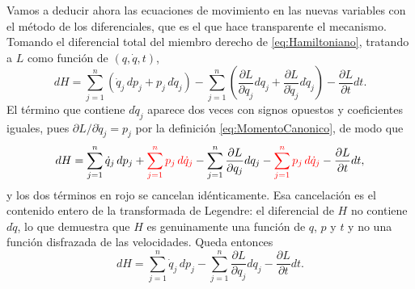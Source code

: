         Vamos a deducir ahora las ecuaciones de movimiento en las nuevas variables con el método de los diferenciales, que es el que hace transparente el mecanismo. Tomando el diferencial total del miembro derecho de \eqref{eq:Hamiltoniano}, tratando a $L$ como función de $(q,\dot{q},t)$,
        \begin{equation}\label{eq:DiferencialH1}
            dH = \sum_{j=1}^{n}\left(\dot{q}_{j}\,dp_{j} + p_{j}\,d\dot{q}_{j}\right)
            - \sum_{j=1}^{n}\left(\frac{\partial L}{\partial q_{j}}dq_{j} + \frac{\partial L}{\partial\dot{q}_{j}}d\dot{q}_{j}\right) - \frac{\partial L}{\partial t}dt .
        \end{equation}
        El término que contiene $d\dot{q}_{j}$ aparece dos veces con signos opuestos y coeficientes iguales, pues $\partial L/\partial\dot{q}_{j} = p_{j}$ por la definición \eqref{eq:MomentoCanonico}, de modo que
        \begin{equation}\label{eq:DiferencialH2}
            dH = \sum_{j=1}^{n}\dot{q}_{j}\,dp_{j} + \textcolor{red}{\sum_{j=1}^{n}p_{j}\,d\dot{q}_{j}} - \sum_{j=1}^{n}\frac{\partial L}{\partial q_{j}}dq_{j} - \textcolor{red}{\sum_{j=1}^{n}p_{j}\,d\dot{q}_{j}} - \frac{\partial L}{\partial t}dt,
        \end{equation}
        y los dos términos en rojo se cancelan idénticamente. Esa cancelación es el contenido entero de la transformada de Legendre: el diferencial de $H$ no contiene $d\dot{q}$, lo que demuestra que $H$ es genuinamente una función de $q$, $p$ y $t$ y no una función disfrazada de las velocidades. Queda entonces
        \begin{equation}\label{eq:DiferencialH3}
            dH = \sum_{j=1}^{n}\dot{q}_{j}\,dp_{j} - \sum_{j=1}^{n}\frac{\partial L}{\partial q_{j}}dq_{j} - \frac{\partial L}{\partial t}dt .
        \end{equation}

